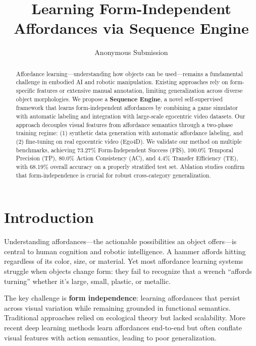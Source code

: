 \documentclass[11pt]{article}
\title{Learning Form-Independent Affordances via Sequence Engine}
\author{Anonymous Submission}
\date{}
\begin{document}
\maketitle

\begin{abstract}
Affordance learning—understanding how objects can be used—remains a fundamental challenge in embodied AI and robotic manipulation. Existing approaches rely on form-specific features or extensive manual annotation, limiting generalization across diverse object morphologies. We propose a \textbf{Sequence Engine}, a novel self-supervised framework that learns form-independent affordances by combining a game simulator with automatic labeling and integration with large-scale egocentric video datasets. Our approach decouples visual features from affordance semantics through a two-phase training regime: (1) synthetic data generation with automatic affordance labeling, and (2) fine-tuning on real egocentric video (Ego4D). We validate our method on multiple benchmarks, achieving 73.27\% Form-Independent Success (FIS), 100.0\% Temporal Precision (TP), 80.0\% Action Consistency (AC), and 4.4\% Transfer Efficiency (TE), with 68.19\% overall accuracy on a properly stratified test set. Ablation studies confirm that form-independence is crucial for robust cross-category generalization.
\end{abstract}

\section{Introduction}

Understanding affordances—the actionable possibilities an object offers—is central to human cognition and robotic intelligence. A hammer affords hitting regardless of its color, size, or material. Yet most affordance learning systems struggle when objects change form: they fail to recognize that a wrench ``affords turning'' whether it's large, small, plastic, or metallic.

The key challenge is \textbf{form independence}: learning affordances that persist across visual variation while remaining grounded in functional semantics. Traditional approaches \cite{gibson1977ecological, turvey1992affordances} relied on ecological theory but lacked scalability. More recent deep learning methods \cite{ha2018world, roy2023learning} learn affordances end-to-end but often conflate visual features with action semantics, leading to poor generalization.
\end{document}
